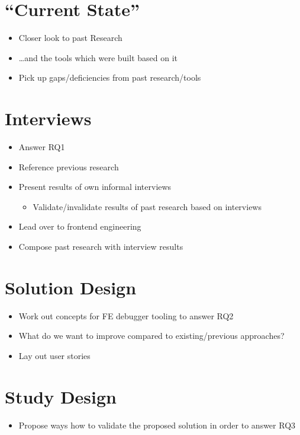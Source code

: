\documentclass[12pt,a4paper]{article}
\begin{document}
\section{``Current State''}
\begin{itemize}
	\item Closer look to past Research
	\item \dots and the tools which were built based on it
	\item Pick up gaps/deficiencies from past research/tools

\end{itemize}

\section{Interviews}
\begin{itemize}
	\item Answer RQ1
	\item Reference previous research
	\item Present results of own informal interviews
	\begin{itemize}
		\item Validate/invalidate results of past research based on interviews
	\end{itemize}
	\item Lead over to frontend engineering
	\item Compose past research with interview results
\end{itemize}

\section{Solution Design}
\begin{itemize}
	\item Work out concepts for FE debugger tooling to answer RQ2
	\item What do we want to improve compared to existing/previous approaches?
	\item Lay out user stories
\end{itemize}

\section{Study Design}
\begin{itemize}
	\item Propose ways how to validate the proposed solution in order to answer RQ3
\end{itemize}
\end{document}
